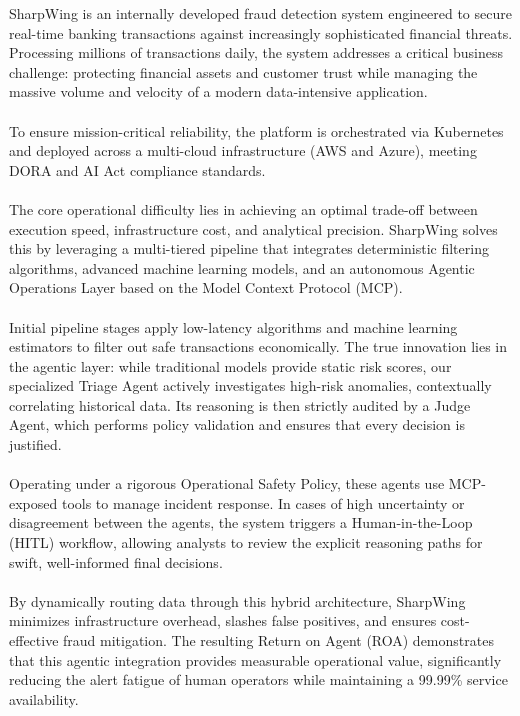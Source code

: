 \documentclass[12pt]{report}
\begin{document}
SharpWing is an internally developed fraud detection system engineered to secure real-time banking transactions against increasingly sophisticated financial threats. Processing millions of transactions daily, the system addresses a critical business challenge: protecting financial assets and customer trust while managing the massive volume and velocity of a modern data-intensive application.\\\\
To ensure mission-critical reliability, the platform is orchestrated via Kubernetes and deployed across a multi-cloud infrastructure (AWS and Azure), meeting DORA and AI Act compliance standards.\\\\
The core operational difficulty lies in achieving an optimal trade-off between execution speed, infrastructure cost, and analytical precision. SharpWing solves this by leveraging a multi-tiered pipeline that integrates deterministic filtering algorithms, advanced machine learning models, and an autonomous Agentic Operations Layer based on the Model Context Protocol (MCP).\\\\
Initial pipeline stages apply low-latency algorithms and machine learning estimators to filter out safe transactions economically. The true innovation lies in the agentic layer: while traditional models provide static risk scores, our specialized Triage Agent actively investigates high-risk anomalies, contextually correlating historical data. Its reasoning is then strictly audited by a Judge Agent, which performs policy validation and ensures that every decision is justified.\\\\
Operating under a rigorous Operational Safety Policy, these agents use MCP-exposed tools to manage incident response. In cases of high uncertainty or disagreement between the agents, the system triggers a Human-in-the-Loop (HITL) workflow, allowing analysts to review the explicit reasoning paths for swift, well-informed final decisions.\\\\
By dynamically routing data through this hybrid architecture, SharpWing minimizes infrastructure overhead, slashes false positives, and ensures cost-effective fraud mitigation. The resulting Return on Agent (ROA) demonstrates that this agentic integration provides measurable operational value, significantly reducing the alert fatigue of human operators while maintaining a 99.99\% service availability.
\end{document}
